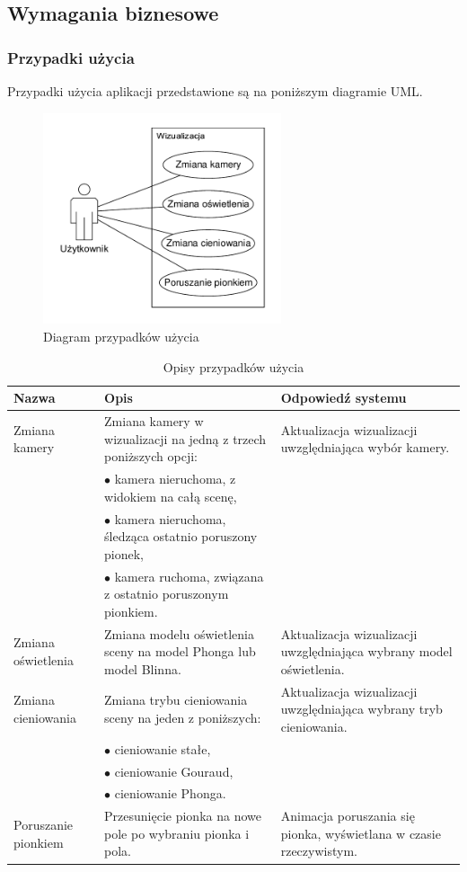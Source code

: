 \documentclass[10pt,a4paper]{article}
\begin{document}
\newpage

\subsection{Wymagania biznesowe}

\subsubsection*{Przypadki użycia}

Przypadki użycia aplikacji przedstawione są na poniższym diagramie UML.

\begin{figure}[H]
	\centering
	\includegraphics[width=7cm]{use-case.pdf}
	\caption{Diagram przypadków użycia}
\end{figure}

\begin{table}[H]
	\begin{tabularx}{\textwidth}{|l|X|X|}
		\hline
		\textbf{Nazwa} & \textbf{Opis} & \textbf{Odpowiedź systemu} \\
		\hline
		Zmiana kamery &
		Zmiana kamery w wizualizacji na jedną z trzech poniższych opcji:
		& Aktualizacja wizualizacji uwzględniająca wybór kamery.
		\\
		& $\bullet$ kamera nieruchoma, z widokiem na całą scenę, & \\
		& $\bullet$ kamera nieruchoma, śledząca ostatnio poruszony pionek, & \\
		& $\bullet$ kamera ruchoma, związana z ostatnio poruszonym pionkiem. & \\
		\hline
		Zmiana oświetlenia &
		Zmiana modelu oświetlenia sceny na model Phonga lub model Blinna. &
		Aktualizacja wizualizacji uwzględniająca wybrany model oświetlenia. \\
		\hline
		Zmiana cieniowania &
		Zmiana trybu cieniowania sceny na jeden z poniższych: &
		Aktualizacja wizualizacji uwzględniająca wybrany tryb cieniowania. \\
		& $\bullet$ cieniowanie stałe, & \\
		& $\bullet$ cieniowanie Gouraud, & \\
		& $\bullet$ cieniowanie Phonga. & \\
		\hline
		Poruszanie pionkiem &
		Przesunięcie pionka na nowe pole po wybraniu pionka i pola. &
		Animacja poruszania się pionka, wyświetlana w czasie rzeczywistym. \\
		\hline
	\end{tabularx}
	\caption{Opisy przypadków użycia}
\end{table}
\end{document}
